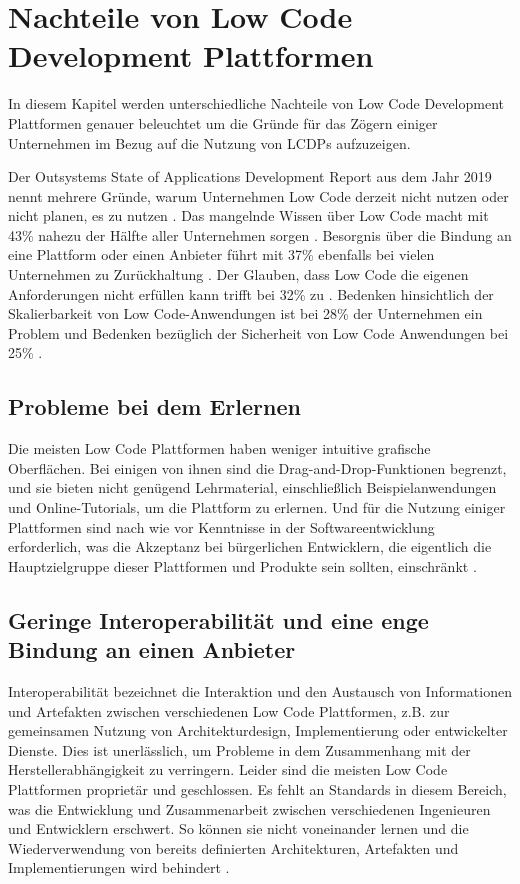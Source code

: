 \documentclass[12pt]{article} %
\begin{document}
	\section{Nachteile von Low Code Development Plattformen} \label{Nachteile}
	In diesem Kapitel werden unterschiedliche Nachteile von Low Code Development Plattformen genauer beleuchtet um die Gründe für das Zögern einiger Unternehmen im Bezug auf die Nutzung von LCDPs aufzuzeigen. \newline
	
	Der Outsystems State of Applications Development Report aus dem Jahr 2019 nennt mehrere Gründe, warum Unternehmen Low Code derzeit nicht nutzen oder nicht planen, es zu nutzen \autocite{KevinShuler.2023}. Das mangelnde Wissen über Low Code macht mit 43\% nahezu der Hälfte aller Unternehmen sorgen \autocite{KevinShuler.2023}. Besorgnis über die Bindung an eine Plattform oder einen Anbieter führt mit 37\% ebenfalls bei vielen Unternehmen zu Zurückhaltung \autocite{KevinShuler.2023}. Der Glauben, dass Low Code die eigenen Anforderungen nicht erfüllen kann trifft bei 32\% zu \autocite{KevinShuler.2023}. Bedenken hinsichtlich der Skalierbarkeit von Low Code-Anwendungen ist bei 28\% der Unternehmen ein Problem und Bedenken bezüglich der Sicherheit von Low Code Anwendungen bei 25\% \autocite{KevinShuler.2023}.
			
	\subsection{Probleme bei dem Erlernen}
	Die meisten Low Code Plattformen haben weniger intuitive grafische Oberflächen. Bei einigen von ihnen sind die Drag-and-Drop-Funktionen begrenzt, und sie bieten nicht genügend Lehrmaterial, einschließlich Beispielanwendungen und Online-Tutorials, um die Plattform zu erlernen. 
	Und für die Nutzung einiger Plattformen sind nach wie vor Kenntnisse in der Softwareentwicklung erforderlich, was die Akzeptanz bei bürgerlichen Entwicklern, die eigentlich die Hauptzielgruppe dieser Plattformen und Produkte sein sollten, einschränkt \autocite{Alamin.2023}.
	
	\subsection{Geringe Interoperabilität und eine enge Bindung an einen Anbieter}
	Interoperabilität bezeichnet die Interaktion und den Austausch von Informationen und Artefakten zwischen verschiedenen Low Code Plattformen, z.B. zur gemeinsamen Nutzung von Architekturdesign, Implementierung oder entwickelter Dienste. Dies ist unerlässlich, um Probleme in dem Zusammenhang mit der Herstellerabhängigkeit zu verringern. Leider sind die meisten Low Code Plattformen proprietär und geschlossen. Es fehlt an Standards in diesem Bereich, was die Entwicklung und Zusammenarbeit zwischen verschiedenen Ingenieuren und Entwicklern erschwert. So können sie nicht voneinander lernen und die Wiederverwendung von bereits definierten Architekturen, Artefakten und Implementierungen wird behindert \autocite{Alamin.2023}.  
	
\end{document}
